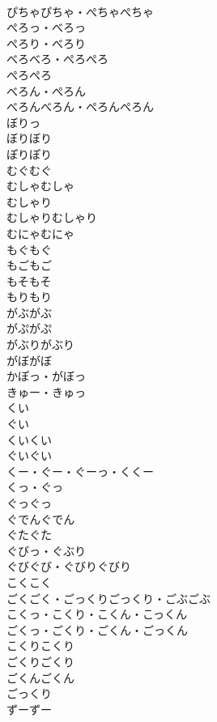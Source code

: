 \documentclass[8pt]{extreport}
\begin{document}
\begin{CJK}{UTF8}{min}
\\	ぴちゃぴちゃ・ぺちゃぺちゃ	
\\	ぺろっ・べろっ	
\\	ぺろり・べろり	
\\	べろべろ・ぺろぺろ	
\\	ぺろぺろ	
\\	べろん・ぺろん	
\\	べろんべろん・ぺろんぺろん	
\\	ぼりっ	
\\	ぼりぼり	
\\	ぽりぽり	
\\	むぐむぐ	
\\	むしゃむしゃ	
\\	むしゃり	
\\	むしゃりむしゃり	
\\	むにゃむにゃ	
\\	もぐもぐ	
\\	もごもご	
\\	もそもそ	
\\	もりもり	
\\	がぶがぶ	
\\	がぷがぷ	
\\	がぶりがぶり	
\\	がぼがぼ	
\\	かぽっ・がぼっ	
\\	きゅー・きゅっ	
\\	くい	
\\	ぐい	
\\	くいくい	
\\	ぐいぐい	
\\	くー・ぐー・ぐーっ・くくー	
\\	くっ・ぐっ	
\\	ぐっぐっ	
\\	ぐでんぐでん	
\\	ぐたぐた	
\\	ぐびっ・ぐぶり	
\\	ぐびぐび・ぐびりぐびり	
\\	こくこく	
\\	ごくごく・ごっくりごっくり・ごぶごぶ	
\\	こくっ・こくり・こくん・こっくん	
\\	ごくっ・ごくり・ごくん・ごっくん	
\\	こくりこくり	
\\	ごくりごくり	
\\	ごくんごくん	
\\	ごっくり	
\\	ずーずー	

\end{CJK}
\end{document}
